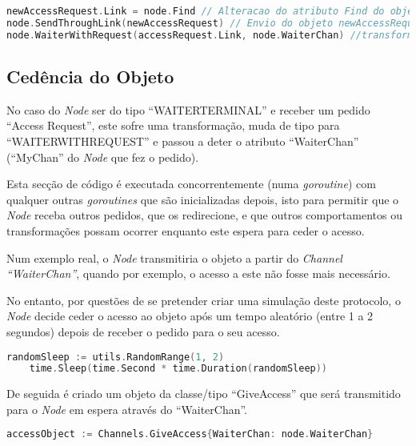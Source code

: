 \begin{lstlisting}[caption={Comportamento do \emph{Node} tipo \emph{Owner Terminal} caso receba um pedido \emph{Access Request} no \emph{Channel ``Find''}},language=Go]
newAccessRequest.Link = node.Find // Alteracao do atributo Find do objeto newAccessRequest para o Find do Node
node.SendThroughLink(newAccessRequest) // Envio do objeto newAccessRequest pelo link
node.WaiterWithRequest(accessRequest.Link, node.WaiterChan) //transformacao do Node. Mantem-se o WaiterChan mas altera-se o Link
\end{lstlisting}

\subsection{Cedência do Objeto}
No caso do \emph{Node} ser do tipo ``WAITER\textunderscore TERMINAL'' e receber um pedido ``Access Request'', 
este sofre uma transformação, muda de tipo para ``WAITER\textunderscore WITH\textunderscore REQUEST'' e passou a deter o atributo ``WaiterChan'' (``MyChan'' do \emph{Node} que fez o pedido).

Esta secção de código é executada concorrentemente (numa \emph{goroutine}) com qualquer outras \emph{goroutines} que são inicializadas depois,
isto para permitir que o \emph{Node} receba outros pedidos, que os redirecione, e que outros comportamentos ou transformações possam ocorrer enquanto este espera para ceder o acesso.


Num exemplo real, o \emph{Node} transmitiria o objeto a partir do \emph{Channel ``WaiterChan''}, quando por exemplo, o acesso a este não fosse mais necessário.

No entanto, por questões de se pretender criar uma simulação deste protocolo, o \emph{Node} decide ceder o acesso ao objeto após um tempo aleatório (entre 1 a 2 segundos)
depois de receber o pedido para o seu acesso.

\begin{lstlisting}[caption={\emph{Node} espera 1 ou 2 segundos antes de ceder o objeto.},language=Go]
	randomSleep := utils.RandomRange(1, 2)
	time.Sleep(time.Second * time.Duration(randomSleep))
\end{lstlisting}

De seguida é criado um objeto da classe/tipo ``GiveAccess'' que será transmitido para o \emph{Node} em espera 
através do ``WaiterChan''.

\begin{lstlisting}[caption={Criação do objeto ``accessObject'', da classe ``GiveAccess''},language=Go]
	accessObject := Channels.GiveAccess{WaiterChan: node.WaiterChan}
\end{lstlisting}


